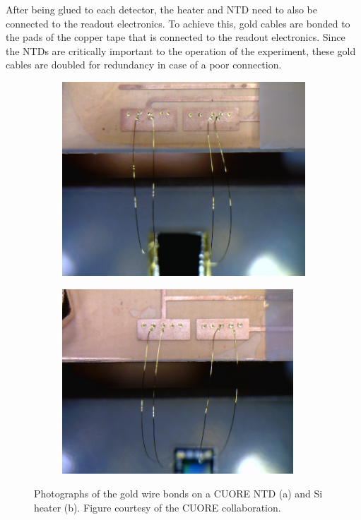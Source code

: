 After being glued to each detector, the heater and NTD need to also be connected to the readout electronics.
To achieve this, gold cables are bonded to the pads of the copper tape that is connected to the readout electronics.
Since the NTDs are critically important to the operation of the experiment, these gold cables are doubled for redundancy in case of a poor connection.

\begin{figure}[htbp]
\centering
\begin{subfigure}[t]{0.45\textwidth}
\centering
    \includegraphics[width=0.95\linewidth]{Figures/NTD_bond.png}
\caption{}
\label{fig:bond_NTD}
\end{subfigure}
\qquad
\begin{subfigure}[t]{0.45\textwidth}
\centering
\includegraphics[width=0.95\textwidth]{Figures/Si_bond.png}
\caption{}
\label{fig:bond_Si}
\end{subfigure}
\caption[Photographs of the gold wire bonds on a CUORE NTD (a) and Si heater (b).]
{Photographs of the gold wire bonds on a CUORE NTD (a) and Si heater (b).
Figure courtesy of the CUORE collaboration.}
\label{fig:bonds}
\end{figure}

